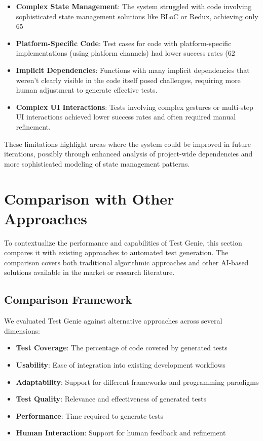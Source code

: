 \begin{itemize}
    \item \textbf{Complex State Management}: The system struggled with code involving sophisticated state management solutions like BLoC or Redux, achieving only 65%
    
    \item \textbf{Platform-Specific Code}: Test cases for code with platform-specific implementations (using platform channels) had lower success rates (62%
    
    \item \textbf{Implicit Dependencies}: Functions with many implicit dependencies that weren't clearly visible in the code itself posed challenges, requiring more human adjustment to generate effective tests.
    
    \item \textbf{Complex UI Interactions}: Tests involving complex gestures or multi-step UI interactions achieved lower success rates and often required manual refinement.
\end{itemize}

These limitations highlight areas where the system could be improved in future iterations, possibly through enhanced analysis of project-wide dependencies and more sophisticated modeling of state management patterns.

\section{Comparison with Other Approaches}

To contextualize the performance and capabilities of Test Genie, this section compares it with existing approaches to automated test generation. The comparison covers both traditional algorithmic approaches and other AI-based solutions available in the market or research literature.

\subsection{Comparison Framework}

We evaluated Test Genie against alternative approaches across several dimensions:

\begin{itemize}
    \item \textbf{Test Coverage}: The percentage of code covered by generated tests
    \item \textbf{Usability}: Ease of integration into existing development workflows
    \item \textbf{Adaptability}: Support for different frameworks and programming paradigms
    \item \textbf{Test Quality}: Relevance and effectiveness of generated tests
    \item \textbf{Performance}: Time required to generate tests
    \item \textbf{Human Interaction}: Support for human feedback and refinement
\end{itemize}

